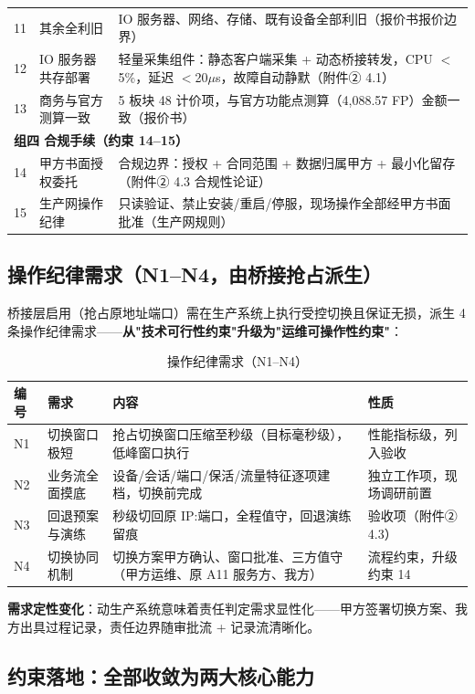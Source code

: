 \documentclass[11pt,a4paper]{ctexart}
\begin{document}
\begin{longtable}{p{1.2cm} p{4.8cm} p{7.8cm}}
11 & 其余全利旧 & IO 服务器、网络、存储、既有设备全部利旧（报价书报价边界） \\
12 & IO 服务器共存部署 & 轻量采集组件：静态客户端采集 + 动态桥接转发，CPU $<$5\%，延迟 $<$20$\mu$s，故障自动静默（附件② 4.1） \\
13 & 商务与官方测算一致 & 5 板块 48 计价项，与官方功能点测算（4,088.57 FP）金额一致（报价书） \\
\midrule
\multicolumn{3}{l}{\textbf{组四 合规手续（约束 14--15）}} \\
14 & 甲方书面授权委托 & 合规边界：授权 + 合同范围 + 数据归属甲方 + 最小化留存（附件② 4.3 合规性论证） \\
15 & 生产网操作纪律 & 只读验证、禁止安装/重启/停服，现场操作全部经甲方书面批准（生产网规则） \\
\bottomrule
\end{longtable}

\subsection{操作纪律需求（N1--N4，由桥接抢占派生）}

桥接层启用（抢占原地址端口）需在生产系统上执行受控切换且保证无损，派生 4 条操作纪律需求——\textbf{从"技术可行性约束"升级为"运维可操作性约束"}：

\begin{table}[H]\centering
\caption{操作纪律需求（N1--N4）}
\begin{tabular}{p{1.0cm} p{3.0cm} p{7.0cm} p{2.8cm}}
\toprule
\textbf{编号} & \textbf{需求} & \textbf{内容} & \textbf{性质} \\
\midrule
N1 & 切换窗口极短 & 抢占切换窗口压缩至秒级（目标毫秒级），低峰窗口执行 & 性能指标级，列入验收 \\
N2 & 业务流全面摸底 & 设备/会话/端口/保活/流量特征逐项建档，切换前完成 & 独立工作项，现场调研前置 \\
N3 & 回退预案与演练 & 秒级切回原 IP:端口，全程值守，回退演练留痕 & 验收项（附件② 4.3） \\
N4 & 切换协同机制 & 切换方案甲方确认、窗口批准、三方值守（甲方运维、原 A11 服务方、我方） & 流程约束，升级约束 14 \\
\bottomrule
\end{tabular}
\end{table}

\textbf{需求定性变化}：动生产系统意味着责任判定需求显性化——甲方签署切换方案、我方出具过程记录，责任边界随审批流 + 记录流清晰化。

\subsection{约束落地：全部收敛为两大核心能力}
\end{document}
